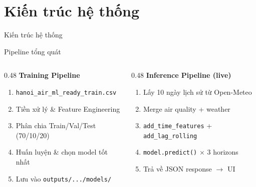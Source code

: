 \documentclass[aspectratio=169]{beamer}
\begin{document}
\section{Kiến trúc hệ thống}

\begin{frame}{Kiến trúc hệ thống}
  \begin{block}{Pipeline tổng quát}
    \centering
  \end{block}
  \vspace{0.5em}
  \begin{columns}[T]
    \begin{column}{0.48\textwidth}
      \textbf{Training Pipeline}
      \begin{enumerate}\small
        \item \texttt{hanoi\_air\_ml\_ready\_train.csv}
        \item Tiền xử lý \& Feature Engineering
        \item Phân chia Train/Val/Test (70/10/20)
        \item Huấn luyện \& chọn model tốt nhất
        \item Lưu vào \texttt{outputs/.../models/}
      \end{enumerate}
    \end{column}
    \begin{column}{0.48\textwidth}
      \textbf{Inference Pipeline (live)}
      \begin{enumerate}\small
        \item Lấy 10 ngày lịch sử từ Open-Meteo
        \item Merge air quality + weather
        \item \texttt{add\_time\_features} + \texttt{add\_lag\_rolling}
        \item \texttt{model.predict()} × 3 horizons
        \item Trả về JSON response $\rightarrow$ UI
      \end{enumerate}
    \end{column}
  \end{columns}
\end{frame}
\end{document}
